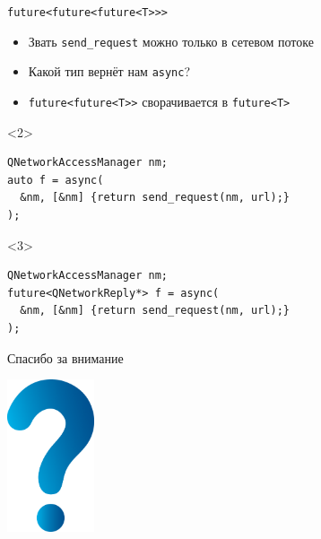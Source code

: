 \documentclass[aspectratio=169,pdf,hyperref={unicode},14pt]{beamer}
\begin{document}
\begin{frame}[fragile,t]{\texttt{future<future<future<T>{}>{}>}}
 \begin{itemize}[<+->]
  \item Звать \texttt{send\_request} можно только в сетевом потоке
  \item Какой тип вернёт нам \texttt{async}?
  \item \texttt{future<future<T>{}>} сворачивается в \texttt{future<T>}
 \end{itemize}
 \begin{onlyenv}<2>
 \begin{lstlisting}[style=cppcode]
QNetworkAccessManager nm;
auto f = async(
  &nm, [&nm] {return send_request(nm, url);}
);
 \end{lstlisting}
 \end{onlyenv}

 \begin{onlyenv}<3>
 \begin{lstlisting}[style=cppcode]
QNetworkAccessManager nm;
future<QNetworkReply*> f = async(
  &nm, [&nm] {return send_request(nm, url);}
);
 \end{lstlisting}
 \end{onlyenv}
\end{frame}


\begin{frame}{Спасибо за внимание}
\centerline{\includegraphics[height=4.5cm]{question_mark_blue.png}}
\end{frame}
\end{document}
